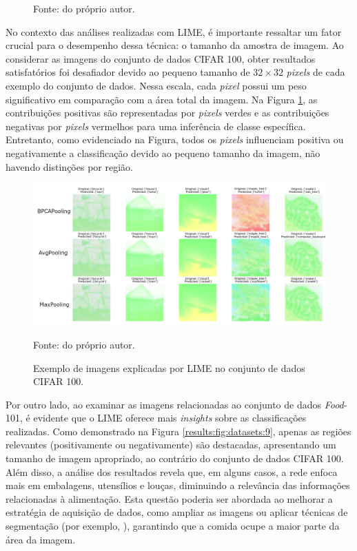\begin{figure}[H]
    Fonte: do próprio autor.
\end{figure}

No contexto das análises realizadas com LIME, é importante ressaltar um fator crucial para o desempenho dessa técnica: o tamanho da amostra de imagem. Ao considerar as imagens do conjunto de dados CIFAR 100, obter resultados satisfatórios foi desafiador devido ao pequeno tamanho de $32 \times 32$ \textit{pixels} de cada exemplo do conjunto de dados. Nessa escala, cada \textit{pixel} possui um peso significativo em comparação com a área total da imagem. Na Figura \ref{results:fig:datasets:8}, as contribuições positivas são representadas por \textit{pixels} verdes e as contribuições negativas por \textit{pixels} vermelhos para uma inferência de classe específica. Entretanto, como evidenciado na Figura, todos os \textit{pixels} influenciam positiva ou negativamente a classificação devido ao pequeno tamanho da imagem, não havendo distinções por região.

\begin{figure}[H]
    \centering
    \caption{Exemplo de imagens explicadas por LIME no conjunto de dados CIFAR 100.}
    \label{results:fig:datasets:8}
    \includegraphics[width=1\textwidth]{recursos/imagens/results/lime_explanations_cifar.png}

    Fonte: do próprio autor.
\end{figure}

Por outro lado, ao examinar as imagens relacionadas ao conjunto de dados \textit{Food}-101, é evidente que o LIME oferece mais \textit{insights} sobre as classificações realizadas. Como demonstrado na Figura \ref{results:fig:datasets:9}, apenas as regiões relevantes (positivamente ou negativamente) são destacadas, apresentando um tamanho de imagem apropriado, ao contrário do conjunto de dados CIFAR 100. Além disso, a análise dos resultados revela que, em alguns casos, a rede enfoca mais em embalagens, utensílios e louças, diminuindo a relevância das informações relacionadas à alimentação. Esta questão poderia ser abordada ao melhorar a estratégia de aquisição de dados, como ampliar as imagens ou aplicar técnicas de segmentação (por exemplo, \cite{rother2004grabcut}), garantindo que a comida ocupe a maior parte da área da imagem.

